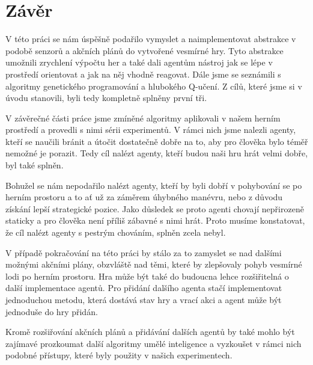 \chapter*{Závěr}
V této práci se nám úspěšně podařilo vymyslet a naimplementovat abstrakce v podobě senzorů a akčních plánů do vytvořené vesmírné hry.
Tyto abstrakce umožnili zrychlení výpočtu her a také dali agentům nástroj jak se lépe v prostředí orientovat a jak na něj vhodně reagovat.
Dále jsme se seznámili s algoritmy genetického programování a hlubokého Q-učení.
Z cílů, které jsme si v úvodu stanovili, byli tedy kompletně splněny první tři.

V závěrečné části práce jsme zmíněné algoritmy aplikovali v našem herním prostředí a provedli s nimi sérii experimentů.
V rámci nich jsme nalezli agenty, kteří se naučili bránit a útočit dostatečně dobře na to, aby pro člověka bylo téměř nemožné je porazit.
Tedy cíl nalézt agenty, kteří budou naši hru hrát velmi dobře, byl také splněn.

Bohužel se nám nepodařilo nalézt agenty, kteří by byli dobří v pohybování se po herním prostoru a to ať už za záměrem úhybného manévru, nebo z důvodu získání lepší strategické pozice.
Jako důsledek se proto agenti chovají nepřirozeně staticky a pro člověka není příliš zábavné s nimi hrát.
Proto musíme konstatovat, že cíl nalézt agenty s pestrým chováním, splněn zcela nebyl.

V případě pokračování na této práci by stálo za to zamyslet se nad dalšími možnými akčními plány, obzvláště nad těmi, které by zlepšovaly pohyb vesmírné lodi po herním prostoru.
Hra může být také do budoucna lehce rozšiřitelná o další implementace agentů. Pro přidání dalšího agenta stačí implementovat jednoduchou metodu, která dostává stav hry a vrací akci a agent může být jednoduše do hry přidán. 

Kromě rozšiřování akčních plánů a přidávání dalších agentů by také mohlo být zajímavé prozkoumat další algoritmy umělé inteligence a vyzkoušet v rámci nich podobné přístupy, které byly použity v našich experimentech.

